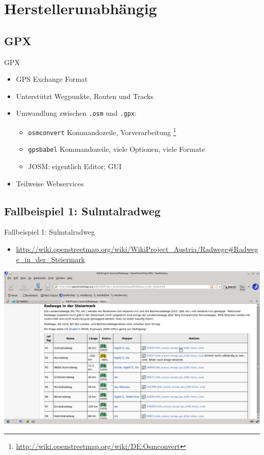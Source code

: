\documentclass{beamer}
\begin{document}
\section{Herstellerunabhängig}
\subsection{GPX}
\begin{frame}
  GPX
  \begin{itemize}
    \item GPS Exchange Format
    \item Unterstützt Wegpunkte, Routen und Tracks
    \item Umwandlung zwischen \texttt{.osm} und \texttt{.gpx}:
    \begin{itemize}
      \item \texttt{osmconvert} Kommandozeile, Vorverarbeitung \footnote{\url{http://wiki.openstreetmap.org/wiki/DE:Osmconvert}}
      \item \texttt{gpsbabel} Kommandozeile, viele Optionen, viele Formate
      \item JOSM: eigentlich Editor; GUI
    \end{itemize}
  \item Teilweise Webservices
  \end{itemize}
\end{frame}

\subsection{Fallbeispiel 1: Sulmtalradweg}
\begin{frame}
Fallbeispiel 1: Sulmtalradweg
\begin{itemize}
  \item
\url{http://wiki.openstreetmap.org/wiki/WikiProject_Austria/Radwege\#Radwege_in_der_Steiermark}
\end{itemize}
  \includegraphics[width=\textwidth, trim=150 100 50 100,clip]{cs1.png}

\end{frame}
\end{document}
